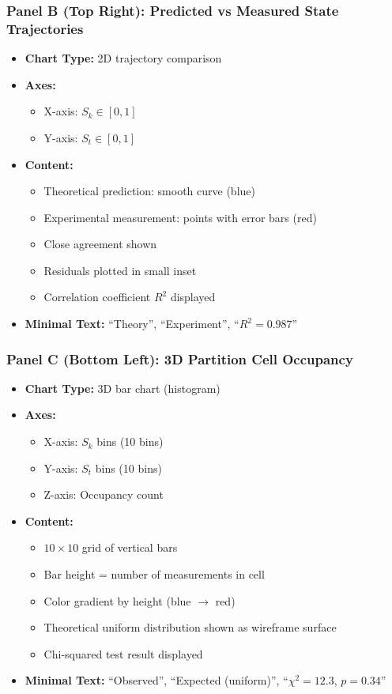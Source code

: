 \subsubsection*{Panel B (Top Right): Predicted vs Measured State Trajectories}
\begin{itemize}
\item \textbf{Chart Type:} 2D trajectory comparison
\item \textbf{Axes:}
  \begin{itemize}
  \item X-axis: $S_k \in [0,1]$
  \item Y-axis: $S_t \in [0,1]$
  \end{itemize}
\item \textbf{Content:}
  \begin{itemize}
  \item Theoretical prediction: smooth curve (blue)
  \item Experimental measurement: points with error bars (red)
  \item Close agreement shown
  \item Residuals plotted in small inset
  \item Correlation coefficient $R^2$ displayed
  \end{itemize}
\item \textbf{Minimal Text:} ``Theory'', ``Experiment'', ``$R^2 = 0.987$''
\end{itemize}

\subsubsection*{Panel C (Bottom Left): 3D Partition Cell Occupancy}
\begin{itemize}
\item \textbf{Chart Type:} 3D bar chart (histogram)
\item \textbf{Axes:}
  \begin{itemize}
  \item X-axis: $S_k$ bins (10 bins)
  \item Y-axis: $S_t$ bins (10 bins)
  \item Z-axis: Occupancy count
  \end{itemize}
\item \textbf{Content:}
  \begin{itemize}
  \item $10 \times 10$ grid of vertical bars
  \item Bar height = number of measurements in cell
  \item Color gradient by height (blue $\to$ red)
  \item Theoretical uniform distribution shown as wireframe surface
  \item Chi-squared test result displayed
  \end{itemize}
\item \textbf{Minimal Text:} ``Observed'', ``Expected (uniform)'', ``$\chi^2 = 12.3$, $p = 0.34$''
\end{itemize}

